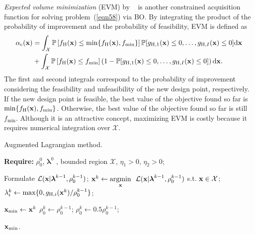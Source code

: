 \documentclass[journal ]{new-aiaa}
\begin{document}
\textit{Expected volume minimization} (EVM) by ~\citet{Picheny2014} is another constrained acquisition function for solving problem~(\ref{eqn58}) via BO.
By integrating the product of the probability of improvement and the probability of feasibility, EVM is defined as
\begin{equation}\label{eqn62}          
	\begin{aligned}
		\alpha_\text{c}({\bf x}) & = \int_{\mathcal{X}} \mathbb{P}\left[f_\text{H}({\bf x}) \leq \min\{f_\text{H}({\bf x}),f_{\min}\}\right] 
		\mathbb{P}[g_{\text{H},1}({\bf x}) \leq 0,\dots,g_{\text{H},I}({\bf x}) \leq 0] \text{d}{\bf x}  \\
		& + \int_{\mathcal{X}} \mathbb{P}\left[f_\text{H}({\bf x}) \leq f_{\min}\right]
		\left(1-\mathbb{P}[g_{\text{H},1}({\bf x}) \leq 0,\dots,g_{\text{H},I}({\bf x}) \leq 0]\right) \text{d}{\bf x}.
	\end{aligned} 
\end{equation}
The first and second integrals correspond to the probability of improvement considering the feasibility and unfeasibility of the new design point, respectively.
If the new design point is feasible, the best value of the objective found so far is $\min\{f_\text{H}({\bf x}),f_{\min}\}$.
Otherwise, the best value of the objective found so far is still $f_{\min}$.
Although it is an attractive concept, maximizing EVM is costly because it requires numerical integration over $\mathcal{X}$.

\begin{algorithm}
	\caption{Augmented Lagrangian method.}\label{Algo6}
	\begin{algorithmic}[1]
		\State \textbf{Require:} $\rho^0_0$, $\boldsymbol{\lambda}^0$ , bounded region $\mathcal{X}$, $\eta_1>0$, $\eta_2>0$; \label{Algo6:1}
		
		\State Formulate $\mathcal{L}({\bf x}|\boldsymbol{\lambda}^{k-1},\rho^{k-1}_0)$; \label{Algo6:3}
		\State ${\bf x}^{k} \gets \underset{{\bf x}}{\mathrm{argmin}} \ \ \mathcal{L}({\bf x}|\boldsymbol{\lambda}^{k-1},\rho^{k-1}_0)$ s.t. ${\bf x} \in \mathcal{X}$; \label{Algo6:4}
		\State ${\lambda}^k_i \gets \max \{0,g_{\text{H},i}({\bf x}^k)/\rho^{k-1}_0\}$;
		
		 \label{Algo6:6}
			\State ${\bf x}_{\min} \gets {\bf x}^{k}$
		\Else
				\State $\rho^k_0 \gets \rho^{k-1}_0$;
			\Else
				\State $\rho^k_0 \gets 0.5\rho^{k-1}_0$;
			\EndIf  	
		\EndIf 
		\EndFor
		
		\State \Return ${\bf x}_{\min}$.
	\end{algorithmic}
\end{algorithm}
\end{document}
